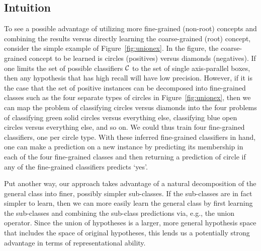\subsection{Intuition}
\label{sec:intuition}

To see a possible advantage of utilizing more fine-grained (non-root)
concepts and combining the results versus directly learning the
coarse-grained (root) concept, consider the simple example of
Figure~\ref{fig:unionex}.  In the figure, the coarse-grained concept
to be learned is circles (positives) versus diamonds (negatives).
If one limits the set of possible classifiers $\cal C$ to the set
of single axis-parallel boxes, then any hypothesis that has high recall
will have low precision.  However, if it is the case that the set
of positive instances can be decomposed into fine-grained classes
such as the four separate types of circles in Figure~\ref{fig:unionex},
then we can map the problem of classifying circles versus diamonds
into the four problems of classifying green solid circles versus
everything else, classifying blue open circles versus everything
else, and so on.  We could thus train four fine-grained classifiers,
one per circle type.  With these inferred fine-grained classifiers
in hand, one can make a prediction on a new instance by predicting
its membership in each of the four fine-grained classes and then
returning a prediction of circle if any of the fine-grained classifiers
predicts `yes'.  

Put another way, our approach takes advantage of a natural decomposition of the
general class into finer, possibly simpler sub-classes.  If the sub-classes
are in fact simpler to learn, then we can more easily learn the general class
by first learning the sub-classes and combining the sub-class predictions via, e.g., the 
union operator.  Since the union of hypotheses is a larger, more general
hypothesis space that includes the space of original hypotheses, this lends us
a potentially strong advantage in terms of representational ability.

